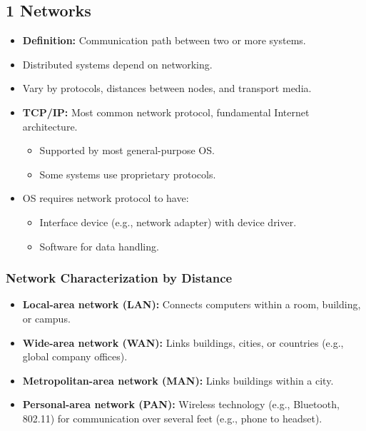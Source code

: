 \documentclass{article}
\begin{document}
\subsection*{1 Networks}
\begin{itemize}
    \item \textbf{Definition:} Communication path between two or more systems.
    \item Distributed systems depend on networking.
    \item Vary by protocols, distances between nodes, and transport media.
    \item \textbf{TCP/IP:} Most common network protocol, fundamental Internet architecture.
    \begin{itemize}
        \item Supported by most general-purpose OS.
        \item Some systems use proprietary protocols.
    \end{itemize}
    \item OS requires network protocol to have:
    \begin{itemize}
        \item Interface device (e.g., network adapter) with device driver.
        \item Software for data handling.
    \end{itemize}
\end{itemize}

\subsubsection*{Network Characterization by Distance}
\begin{itemize}
    \item \textbf{Local-area network (LAN):} Connects computers within a room, building, or campus.
    \item \textbf{Wide-area network (WAN):} Links buildings, cities, or countries (e.g., global company offices).
    \item \textbf{Metropolitan-area network (MAN):} Links buildings within a city.
    \item \textbf{Personal-area network (PAN):} Wireless technology (e.g., Bluetooth, 802.11) for communication over several feet (e.g., phone to headset).
\end{itemize}
\end{document}
